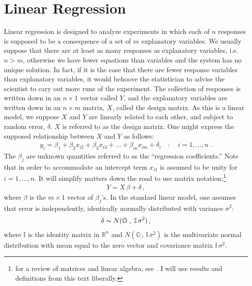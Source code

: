 \chapter{ Linear Regression }
\label{Linear Regression}
Linear regression is designed to analyze experiments in which each of $n$ responses is supposed to be a consequence of a set of $m$ explanatory variables. We usually suppose that there are at least as many responses as explanatory variables, i.e. $n >m$, otherwise we have fewer equations than variables and the system has no unique solution. In fact, if it is the case that there are fewer response variables than explanatory variables, it would behoove the statistician to advise the scientist to cary out more runs of the experiment. The collection of responses is written down in an $n \times 1$ vector called $Y$, and the explanatory variables are written down in an $n \times m$ matrix, $X$, called the design matrix. As this is a linear model, we suppose $X$ and $Y$ are linearly related to each other, and subject to random error, $\delta$. $X$ is referred to as the design matrix. One might express the supposed relationship between $X$ and $Y$ as follows: 
\begin{eqnarray} y_i = \beta_1 + \beta_2 x_{i2} + \beta_3x_{i3} + \dots + \beta_m x_{im} + \delta_i  \quad : \quad i = 1, \dots , n \;.\label{LinearModel} \end{eqnarray} 
The $\beta_j$ are unknown quantities referred to as the ``regression coefficients.'' Note that in order to accommodate an intercept term  $x_{i1}$ is assumed to be unity for $i = 1, \dots, n$. It will simplify matters down the road to use matrix notation:\footnote{for a review of matrices and linear algebra, see \cite{linear}. I will use results and definitions from this text liberally.} \begin{eqnarray} Y = X \, \beta + \delta \,, \label{MatrixLM} \end{eqnarray}
where $\beta$ is the $m \times 1$ vector of $\beta_j$'s. In the standard linear model, one assumes that error is independently, identically normally distributed with variance $\sigma^2$: 
\begin{eqnarray}  \delta \thicksim N( \mathbb{O} \;,\; \mathbb{I} \, \sigma^2) \,, \label{MatrixError}\end{eqnarray}
where $\mathbb{I}$ is the identity matrix in $\mathbb{R}^n $ and $ N(\mathbb{O} \,,\, \mathbb{I} \, \sigma^2)$ is the multivariate normal distribution with mean equal to the zero vector and covariance matrix  $ \mathbb{I} \, \sigma^2$.

